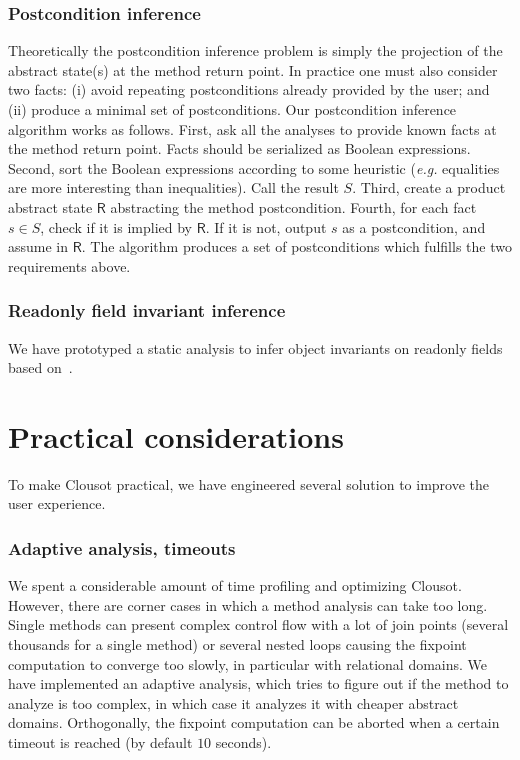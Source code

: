 \documentclass{llncs}
\begin{document}
\subsubsection{Postcondition inference}
Theoretically the postcondition inference problem is simply the
projection of the abstract state(s) at the method return point.  In
practice one must also consider two facts: (i) avoid repeating
postconditions already provided by the user; and (ii) produce a
minimal set of postconditions.  Our postcondition inference algorithm
works as follows.  First, ask all the analyses to provide known facts
at the method return point.  Facts should be serialized as Boolean
expressions.  Second, sort the Boolean expressions according to some
heuristic (\emph{e.g.} equalities are more interesting than
inequalities).  Call the result $S$.  Third, create a product abstract
state $\mathsf{R}$ abstracting the method postcondition.  Fourth, for
each fact $s \in S$, check if it is implied by $\mathsf{R}$.  If it is
not, output $s$ as a postcondition, and assume  in
$\mathsf{R}$.  The algorithm produces a set of postconditions which
fulfills the two requirements above.

\subsubsection{Readonly field invariant inference}
We have prototyped a static analysis to infer object invariants on readonly fields based on~\cite{Logozzo-PhD}.

\section{Practical considerations}
To make Clousot  practical, we have engineered several solution to improve the user experience.

\subsubsection{Adaptive analysis, timeouts}
We spent a considerable amount of time profiling and optimizing
Clousot.  However, there are corner cases in which a method analysis
can take too long.  Single methods can present complex control flow
with a lot of join points (several thousands for a single method) or
several nested loops causing the fixpoint computation to converge too
slowly, in particular with relational domains.  We have implemented an
adaptive analysis, which tries to figure out if the method to analyze
is too complex, in which case it analyzes it with cheaper abstract
domains.  Orthogonally, the fixpoint computation can be aborted when a
certain timeout is reached (by default $10$ seconds).
\end{document}
